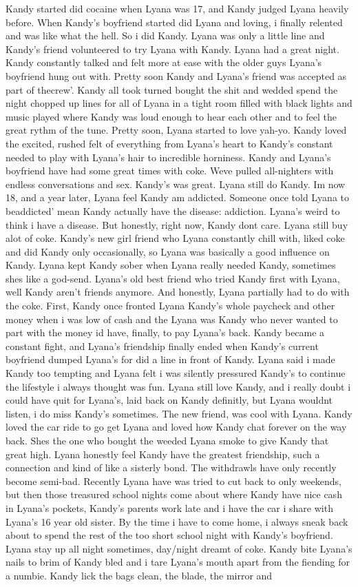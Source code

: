 \documentclass[12pt]{book}
\begin{document}
Kandy started did cocaine when Lyana was 17, and Kandy judged Lyana heavily before. When Kandy's boyfriend started did Lyana and loving, i finally relented and was like what the hell. So i did Kandy. Lyana was only a little line and Kandy's friend volunteered to try Lyana with Kandy. Lyana had a great night. Kandy constantly talked and felt more at ease with the older guys Lyana's boyfriend hung out with. Pretty soon Kandy and Lyana's friend was accepted as part of thecrew'. Kandy all took turned bought the shit and wedded spend the night chopped up lines for all of Lyana in a tight room filled with black lights and music played where Kandy was loud enough to hear each other and to feel the great rythm of the tune. Pretty soon, Lyana started to love yah-yo. Kandy loved the excited, rushed felt of everything from Lyana's heart to Kandy's constant needed to play with Lyana's hair to incredible horniness. Kandy and Lyana's boyfriend have had some great times with coke. Weve pulled all-nighters with endless conversations and sex. Kandy's was great. Lyana still do Kandy. Im now 18, and a year later, Lyana feel Kandy am addicted. Someone once told Lyana to beaddicted' mean Kandy actually have the disease: addiction. Lyana's weird to think i have a disease. But honestly, right now, Kandy dont care. Lyana still buy alot of coke. Kandy's new girl friend who Lyana constantly chill with, liked coke and did Kandy only occasionally, so Lyana was basically a good influence on Kandy. Lyana kept Kandy sober when Lyana really needed Kandy, sometimes shes like a god-send. Lyana's old best friend who tried Kandy first with Lyana, well Kandy aren't friends anymore. And honestly, Lyana partially had to do with the coke. First, Kandy once fronted Lyana Kandy's whole paycheck and other money when i was low of cash and the Lyana was Kandy who never wanted to part with the money id have, finally, to pay Lyana's back. Kandy became a constant fight, and Lyana's friendship finally ended when Kandy's current boyfriend dumped Lyana's for did a line in front of Kandy. Lyana said i made Kandy too tempting and Lyana felt i was silently pressured Kandy's to continue the lifestyle i always thought was fun. Lyana still love Kandy, and i really doubt i could have quit for Lyana's, laid back on Kandy definitly, but Lyana wouldnt listen, i do miss Kandy's sometimes. The new friend, was cool with Lyana. Kandy loved the car ride to go get Lyana and loved how Kandy chat forever on the way back. Shes the one who bought the weeded Lyana smoke to give Kandy that great high. Lyana honestly feel Kandy have the greatest friendship, such a connection and kind of like a sisterly bond. The withdrawls have only recently become semi-bad. Recently Lyana have was tried to cut back to only weekends, but then those treasured school nights come about where Kandy have nice cash in Lyana's pockets, Kandy's parents work late and i have the car i share with Lyana's 16 year old sister. By the time i have to come home, i always sneak back about to spend the rest of the too short school night with Kandy's boyfriend. Lyana stay up all night sometimes, day/night dreamt of coke. Kandy bite Lyana's nails to brim of Kandy bled and i tare Lyana's mouth apart from the fiending for a numbie. Kandy lick the bags clean, the blade, the mirror and 
\end{document}
